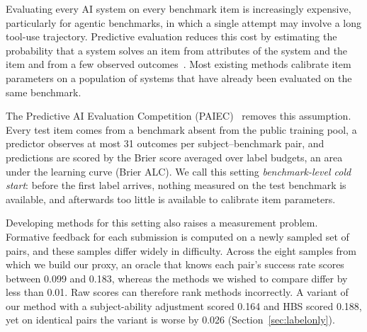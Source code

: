 \documentclass{article}
\begin{document}
Evaluating every AI system on every benchmark item is increasingly expensive, particularly for agentic benchmarks, in which a single attempt may involve a long tool-use trajectory. Predictive evaluation reduces this cost by estimating the probability that a system solves an item from attributes of the system and the item and from a few observed outcomes~\citep{truong2025reliable,maiapolo2024tinybenchmarks}. Most existing methods calibrate item parameters on a population of systems that have already been evaluated on the same benchmark.

The Predictive AI Evaluation Competition (PAIEC)~\citep{paiec2026} removes this assumption. Every test item comes from a benchmark absent from the public training pool, a predictor observes at most 31 outcomes per subject--benchmark pair, and predictions are scored by the Brier score averaged over label budgets, an area under the learning curve (Brier ALC). We call this setting \emph{benchmark-level cold start}: before the first label arrives, nothing measured on the test benchmark is available, and afterwards too little is available to calibrate item parameters.

Developing methods for this setting also raises a measurement problem. Formative feedback for each submission is computed on a newly sampled set of pairs, and these samples differ widely in difficulty. Across the eight samples from which we build our proxy, an oracle that knows each pair's success rate scores between 0.099 and 0.183, whereas the methods we wished to compare differ by less than 0.01. Raw scores can therefore rank methods incorrectly. A variant of our method with a subject-ability adjustment scored 0.164 and HBS scored 0.188, yet on identical pairs the variant is worse by 0.026 (Section~\ref{sec:labelonly}).
\end{document}
